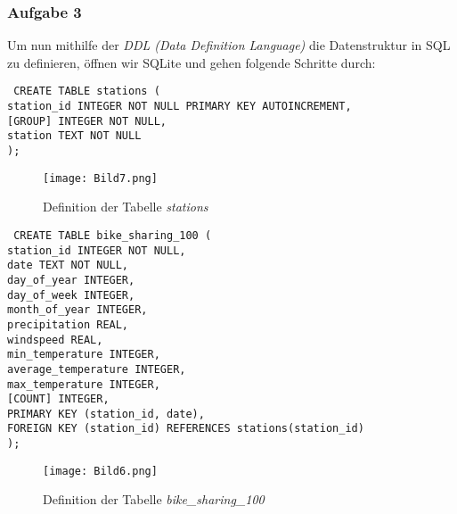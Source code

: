 \documentclass[a4paper, 12pt]{article}
\begin{document}
\newpage
\subsubsection{Aufgabe 3}

Um nun mithilfe der \textit{DDL (Data Definition Language)} die Datenstruktur in SQL zu definieren, öffnen wir SQLite und gehen folgende Schritte durch:

\vspace{\baselineskip} 

{\fontsize{10}{12}\selectfont
\texttt{%
CREATE TABLE stations ( \\
    station\_id INTEGER NOT NULL PRIMARY KEY AUTOINCREMENT, \\
    {[}GROUP{]} INTEGER NOT NULL, \\
    station TEXT NOT NULL \\
);
}}

\vspace{\baselineskip} 

\begin{figure}[H]
    \centering
    \texttt{[image: Bild7.png]}
    \par Definition der Tabelle \textit{stations}
\end{figure} 

{\fontsize{10}{12}\selectfont
\texttt{%
CREATE TABLE bike\_sharing\_100 ( \\
    station\_id INTEGER NOT NULL, \\
    date TEXT NOT NULL, \\
    day\_of\_year INTEGER, \\
    day\_of\_week INTEGER, \\
    month\_of\_year INTEGER, \\
    precipitation REAL, \\
    windspeed REAL, \\
    min\_temperature INTEGER, \\
    average\_temperature INTEGER, \\
    max\_temperature INTEGER, \\
    {[}COUNT{]} INTEGER, \\
    PRIMARY KEY (station\_id, date), \\
    FOREIGN KEY (station\_id) REFERENCES stations(station\_id) \\
);
}} 
\\
\begin{figure}[H]
    \centering
    \texttt{[image: Bild6.png]}
    \par Definition der Tabelle \textit{bike\_sharing\_100}
\end{figure}
\end{document}
